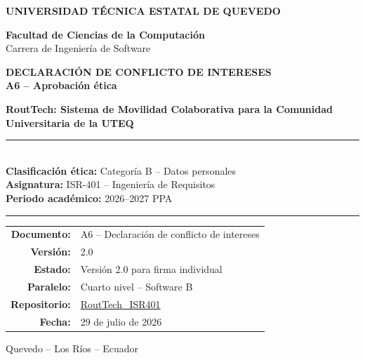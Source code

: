 \documentclass[10pt,a4paper]{article}
\newcommand{\Proyecto}{RoutTech: Sistema de Movilidad Colaborativa para la Comunidad Universitaria de la UTEQ}
\newcommand{\Asignatura}{ISR-401 -- Ingeniería de Requisitos}
\newcommand{\Periodo}{2026--2027 PPA}
\newcommand{\CategoriaEtica}{Categoría B -- Datos personales}
\newcommand{\Repositorio}{https://github.com/AnderJM3/RoutTech_ISR401}
\newcommand{\FechaDocumento}{29 de julio de 2026}
\newcommand{\VersionDocumento}{2.0}
\newcommand{\Paralelo}{Cuarto nivel -- Software B}
\begin{document}
\justifying

\thispagestyle{empty}

\vspace*{0.65cm}
\begin{center}
{\color{white}\Large\bfseries UNIVERSIDAD TÉCNICA ESTATAL DE QUEVEDO}

\vspace{1.75cm}
{\large\bfseries\color{RTForest} Facultad de Ciencias de la Computación\\[4pt]}
{\normalsize\color{RTGray} Carrera de Ingeniería de Software}

\vspace{0.8cm}

{\Huge\bfseries\color{RTForest} DECLARACIÓN DE CONFLICTO DE INTERESES\\[8pt]}
{\Large\bfseries\color{RTTerracotta} A6 -- Aprobación ética}

\vspace{1.0cm}

{\large\bfseries \Proyecto}\\[8pt]
{\color{RTGold}\rule{0.84\textwidth}{1.2pt}}\\[7pt]
\textbf{Clasificación ética:} \CategoriaEtica\\
\textbf{Asignatura:} \Asignatura\\
\textbf{Periodo académico:} \Periodo\\[7pt]
{\color{RTGold}\rule{0.84\textwidth}{1.2pt}}

\vfill
\begin{tabular}{rl}
\textbf{Documento:} & A6 -- Declaración de conflicto de intereses\\
\textbf{Versión:} & \VersionDocumento\\
\textbf{Estado:} & Versión 2.0 para firma individual\\
\textbf{Paralelo:} & \Paralelo\\
\textbf{Repositorio:} & \href{\Repositorio}{RoutTech\_ISR401}\\
\textbf{Fecha:} & \FechaDocumento
\end{tabular}

\vspace{0.75cm}
{\small Quevedo -- Los Ríos -- Ecuador}
\end{center}
\clearpage
\end{document}
